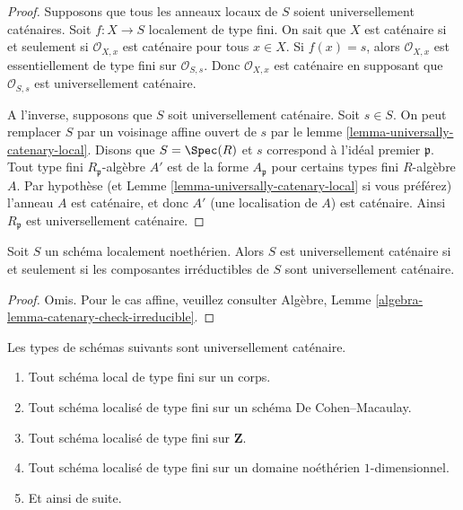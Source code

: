 \begin{proof}
Supposons que tous les anneaux locaux de $S$ soient universellement
caténaires. Soit $f : X \to S$ localement
de type fini. On sait que $X$ est caténaire si et
seulement si $\mathcal{O}_{X, x}$ est caténaire pour tous $x \in X$. Si $f(x) = s$,
alors $\mathcal{O}_{X, x}$ est essentiellement de type fini sur $\mathcal{O}_{S, s}$.
Donc $\mathcal{O}_{X, x}$ est caténaire en supposant que
$\mathcal{O}_{S, s}$ est universellement caténaire.

\medskip\noindent A
l’inverse, supposons que $S$ soit universellement caténaire. Soit
$s \in S$. On peut remplacer $S$ par un voisinage affine
ouvert de $s$ par le lemme \ref{lemma-universally-catenary-local}. Disons que $S = \Spec(R)$
et $s$ correspond à l'idéal premier $\mathfrak p$. Tout type
fini $R_{\mathfrak p}$-algèbre $A'$ est de la forme
$A_{\mathfrak p}$ pour certains types fini $R$-algèbre $A$.
Par hypothèse (et Lemme \ref{lemma-universally-catenary-local} si vous préférez) l'anneau $A$
est caténaire, et donc $A'$ (une localisation de $A$) est
caténaire. Ainsi $R_{\mathfrak p}$ est universellement caténaire.
\end{proof}

\begin{lemma}
\label{lemma-catenary-check-irreducible}
Soit $S$ un schéma localement noethérien. Alors $S$ est universellement caténaire
si et seulement si les composantes irréductibles de $S$ sont universellement caténaire.
\end{lemma}

\begin{proof}
Omis. Pour le cas affine, veuillez
consulter Algèbre, Lemme \ref{algebra-lemma-catenary-check-irreducible}.
\end{proof}

\begin{lemma}
\label{lemma-ubiquity-uc}
Les types de schémas suivants sont universellement caténaire.
\begin{enumerate}
\item Tout schéma local de type fini sur un corps.
\item Tout schéma localisé de type fini sur un schéma De Cohen--Macaulay.
\item Tout schéma localisé de type fini sur $\mathbf{Z}$.
\item Tout schéma localisé de type fini sur un domaine noéthérien
$1$-dimensionnel.
\item Et ainsi de suite.
\end{enumerate}
\end{lemma}

